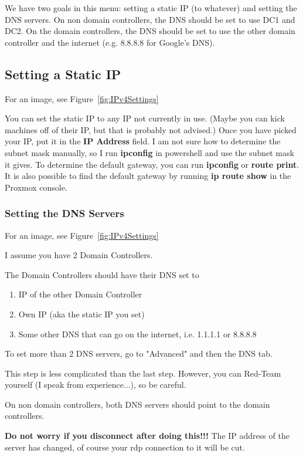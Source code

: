\documentclass{article}
\begin{document}
We have two goals in this menu: setting a static IP (to whatever) and setting the DNS servers. 
On non domain controllers, the DNS should be set to use DC1 and DC2.
On the domain controllers, the DNS should be set to use the other domain controller and the internet (e.g. 8.8.8.8 for Google's DNS).

\subsection{Setting a Static IP}
For an image, see Figure~\ref{fig:IPv4Settings}

You can set the static IP to any IP not currently in use.
(Maybe you can kick machines off of their IP, but that is probably not advised.)
Once you have picked your IP, put it in the \textbf{IP Address} field.
I am not sure how to determine the subnet mask manually, so I run \textbf{ipconfig} in powershell
and use the subnet mask it gives.
To determine the default gateway, you can run \textbf{ipconfig} or \textbf{route print}.
It is also possible to find the default gateway by running \textbf{ip route show} in the Proxmox console. 


\subsubsection{Setting the DNS Servers}
For an image, see Figure~\ref{fig:IPv4Settings}

I assume you have 2 Domain Controllers.

The Domain Controllers should have their DNS set to
\begin{enumerate}
        \item IP of the other Domain Controller
        \item Own IP (aka the static IP you set)
        \item Some other DNS that can go on the internet, i.e. 1.1.1.1 or 8.8.8.8
\end{enumerate}

To set more than 2 DNS servers, go to "Advanced" and then the DNS tab.

This step is less complicated than the last step. However, you can Red-Team yourself (I speak from experience...), so be careful.

On non domain controllers, both DNS servers should point to the domain controllers.

\textbf{Do not worry if you disconnect after doing this!!!}
The IP address of the server has changed, of course your rdp connection to it will be cut.
\end{document}
